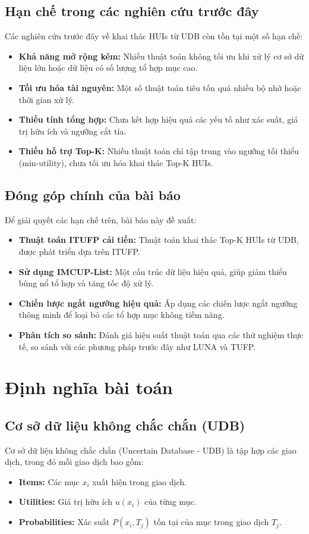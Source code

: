 \documentclass[conference]{IEEEtran}
\begin{document}
\subsection{Hạn chế trong các nghiên cứu trước đây}
Các nghiên cứu trước đây về khai thác HUIs từ UDB còn tồn tại một số hạn chế:
\begin{itemize}
    \item \textbf{Khả năng mở rộng kém:} Nhiều thuật toán không tối ưu khi xử lý cơ sở dữ liệu lớn hoặc dữ liệu có số lượng tổ hợp mục cao.
    \item \textbf{Tối ưu hóa tài nguyên:} Một số thuật toán tiêu tốn quá nhiều bộ nhớ hoặc thời gian xử lý.
    \item \textbf{Thiếu tính tổng hợp:} Chưa kết hợp hiệu quả các yếu tố như xác suất, giá trị hữu ích và ngưỡng cắt tỉa.
    \item \textbf{Thiếu hỗ trợ Top-K:} Nhiều thuật toán chỉ tập trung vào ngưỡng tối thiểu (min-utility), chưa tối ưu hóa khai thác Top-K HUIs.
\end{itemize}

\subsection{Đóng góp chính của bài báo}
Để giải quyết các hạn chế trên, bài báo này đề xuất:
\begin{itemize}
    \item \textbf{Thuật toán ITUFP cải tiến:} Thuật toán khai thác Top-K HUIs từ UDB, được phát triển dựa trên ITUFP.
    \item \textbf{Sử dụng IMCUP-List:} Một cấu trúc dữ liệu hiệu quả, giúp giảm thiểu bùng nổ tổ hợp và tăng tốc độ xử lý.
    \item \textbf{Chiến lược ngắt ngưỡng hiệu quả:} Áp dụng các chiến lược ngắt ngưỡng thông minh để loại bỏ các tổ hợp mục không tiềm năng.
    \item \textbf{Phân tích so sánh:} Đánh giá hiệu suất thuật toán qua các thử nghiệm thực tế, so sánh với các phương pháp trước đây như LUNA và TUFP.
\end{itemize}

\section{Định nghĩa bài toán}
\label{sec:problem_definition}

\subsection{Cơ sở dữ liệu không chắc chắn (UDB)}
Cơ sở dữ liệu không chắc chắn (Uncertain Database - UDB) là tập hợp các giao dịch, trong đó mỗi giao dịch bao gồm:
\begin{itemize}
    \item \textbf{Items:} Các mục \(x_i\) xuất hiện trong giao dịch.
    \item \textbf{Utilities:} Giá trị hữu ích \(u(x_i)\) của từng mục.
    \item \textbf{Probabilities:} Xác suất \(P(x_i, T_j)\) tồn tại của mục trong giao dịch \(T_j\).
\end{itemize}
\end{document}
